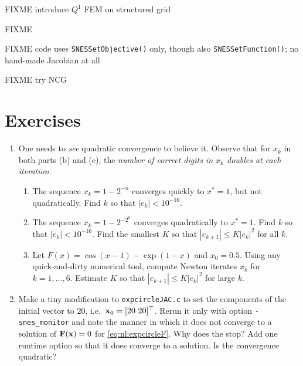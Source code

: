 FIXME introduce $Q^1$ FEM on structured grid

\begin{marginfigure}

\caption{FIXME}
\label{fig:q1hat}
\end{marginfigure}

FIXME code uses \texttt{SNESSetObjective()} only, though also \texttt{SNESSetFunction()}; no hand-made Jacobian at all

FIXME try NCG


\section{Exercises}

\renewcommand{\labelenumi}{\arabic{chapter}.\arabic{enumi}\quad}
\renewcommand{\labelenumii}{(\alph{enumii})}
\begin{enumerate}
\item One needs to \emph{see} quadratic convergence to believe it.  Observe that for $x_k$ in both parts (b) and (c), the \emph{number of correct digits in $x_k$ doubles at each iteration}.
    \begin{enumerate}
    \item The sequence $x_k = 1-2^{-n}$ converges quickly to $x^*=1$, but not quadratically.  Find $k$ so that $|e_k| < 10^{-16}$.
    \item The sequence $x_k = 1-2^{-2^n}$ converges quadratically to $x^*=1$.  Find $k$ so that $|e_k| < 10^{-16}$.  Find the smallest $K$ so that $|e_{k+1}| \le K |e_k|^2$ for all $k$.
    \item Let $F(x) = \cos(x-1) - \exp(1-x)$ and $x_0=0.5$.  Using any quick-and-dirty numerical tool, compute Newton iterates $x_k$ for $k=1,\dots,6$.  Estimate $K$ so that $|e_{k+1}| \le K |e_k|^2$ for large $k$.
    \end{enumerate}

\item Make a tiny modification to \texttt{expcircleJAC.c} to set the components of the initial vector to $20$, i.e.~$\mathbf{x}_0 = [20\,\, 20]^\top$.  Rerun it only with option \texttt{-snes\_monitor} and note the manner in which it does not converge to a solution of $\mathbf{F}(\mathbf{x})=0$ for \eqref{eq:nl:expcircleF}.  Why does the \pSNES stop?  Add one runtime option so that it does converge to a solution.  Is the convergence quadratic?


\end{enumerate}
